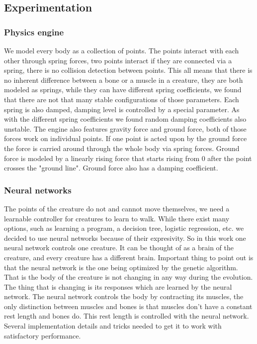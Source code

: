 \subsection{\LARGE Experimentation}
\subsubsection{\textbf{\large Physics engine}}
    We model every body as a collection of points. The points interact with each other through spring forces, two points interact if they are connected via a spring, there is no collision detection between points. This all means that there is no inherent difference between a bone or a muscle in a creature, they are both modeled as springs, while they can have different spring coefficients, we found that there are not that many stable configurations of those parameters. Each spring is also damped, damping level is controlled by a special parameter. As with the different spring coefficients we found random damping coefficients also unstable. The engine also features gravity force and ground force, both of those forces work on individual points. If one point is acted upon by the ground force the force is carried around through the whole body via spring forces.
    Ground force is modeled by a linearly rising force that starts rising from 0 after the point crosses the "ground line". Ground force also has a damping coefficient.

\subsubsection{\textbf{\large Neural networks}}
    The points of the creature do not and cannot move themselves, we need a learnable controller for creatures to learn to walk.
    While there exist many options, such as learning a program, a decision tree, logistic regression, etc. we decided to use neural networks because of their expresivity. So in this work one neural network controls one creature. It can be thought of as a brain of the creature, and every creature has a different brain. Important thing to point out is that the neural network is the one being optimized by the genetic algorithm. That is the body of the creature is not changing in any way during the evolution. The thing that is changing is its responses which are learned by the neural network. The neural network controls the body by contracting its muscles, the only distinction between muscles and bones is that muscles don't have a constant rest length and bones do. This rest length is controlled with the neural network. Several implementation details and tricks needed to get it to work with satisfactory performance.
        
